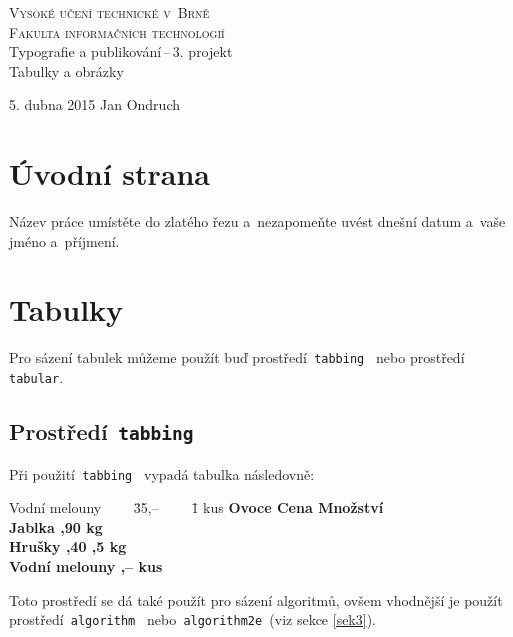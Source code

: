 \documentclass[11pt,a4paper,oneside]{article}
\begin{document}
\begin{titlepage}
\begin{center}

{\Huge\textsc{{Vysoké učení technické v~Brně}}}\\
\bigskip
{\huge\textsc{{Fakulta informačních technologií}}}\\
{\LARGE{Typografie a publikování\,--\,3. projekt}}\\
\medskip
{\Huge{Tabulky a obrázky}}
\end{center}		
\Large{5. dubna 2015 \hfill Jan Ondruch}
\end{titlepage}

	\section{Úvodní strana}
	
	Název práce umístěte do zlatého řezu a~nezapomeňte uvést dnešní datum a~vaše jméno a~příjmení.
		
	\section{Tabulky}
	
	Pro sázení tabulek můžeme použít buď prostředí\texttt{ tabbing } nebo prostředí\texttt{ tabular}.
	
	\cprotect\subsection{Prostředí\texttt{ tabbing}} 
	
	Při použití\texttt{ tabbing } vypadá tabulka následovně:

 	\begin{tabbing}
    		Vodní melouny ~~~~\= 35,-- ~~~~\= 1 kus \kill 
	    \bfseries Ovoce \>
	    \bfseries Cena \>
    		\bfseries Množství \\
    		Jablka ,90  kg\\
    		Hrušky ,40 ,5 kg\\
		Vodní melouny ,--  kus
	\end{tabbing} \medskip
		
\noindent Toto prostředí se dá také použít pro sázení algoritmů, ovšem vhodnější je použít prostředí\texttt{ algorithm } nebo\texttt{ algorithm2e }(viz sekce \ref{sek3}). 
\end{document}
